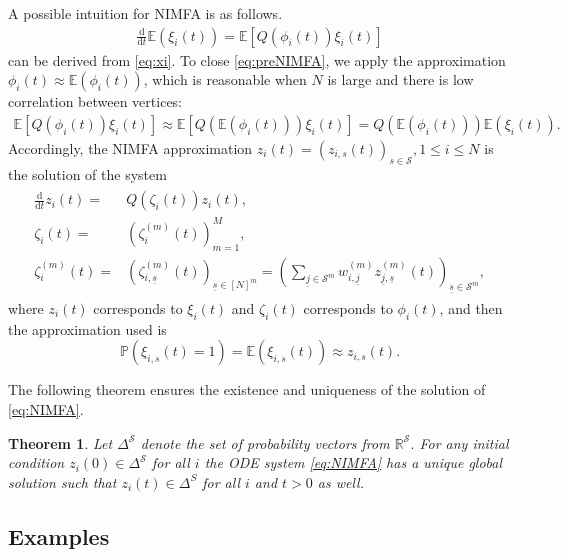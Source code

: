 \documentclass{article}
\newcommand{\pr}{\mathbb{P}}
\newcommand{\E}{\mathbb{E}}
\renewcommand{\d}{\mathrm{d}}
\newcommand{\1}[1]{{\mathds{1}}_{\left\{#1\right\}}}
\renewcommand{\S}{\mathcal{S}}
\newtheorem{theorem}{Theorem}
\begin{document}
	A possible intuition for NIMFA is as follows.
	\begin{align}
		\label{eq:preNIMFA}
		\frac{\d}{\d t} \E \left(\xi_{i}(t) \right)= \E \left[Q \left(\phi_{i}(t)\right) \xi_{i}(t) \right]
	\end{align}
	can be derived from \eqref{eq:xi}. To close \eqref{eq:preNIMFA}, we apply the approximation $\phi_{i}(t) \approx \E \left( \phi_i(t) \right)$, which is reasonable when $N$ is large and there is low correlation between vertices:
	\begin{align*}
		\E \left[Q \left(\phi_{i}(t)\right) \xi_{i}(t) \right] \approx  \E \left[Q \left(\E \left(\phi_{i}(t) \right )\right) \xi_{i}(t) \right]=Q \left(\E \left(\phi_{i}(t) \right )\right) \E \left(\xi_{i}(t) \right).
	\end{align*}
	Accordingly, the NIMFA approximation $z_i(t)=(z_{i,s}(t))_{s\in \S},1\leq i\leq N$ is the solution of the system
	\begin{align}
		\label{eq:NIMFA}
		\begin{split}
			\frac{\d}{\d t} z_{i}(t)=& Q \left(\zeta_{i}(t) \right)z_{i}(t), \\
			\zeta_{i}(t)=& \left(\zeta_{i}^{(m)}(t) \right)_{m=1}^M, \\
			\zeta_{i}^{(m)}(t)=& \left(\zeta_{i,\underline{s}}^{(m)}(t)\right)_{\underline{s} \in [N]^m}=\left(\sum_{\underline{j} \in \S^m} w_{i,\underline{j}}^{(m)} z_{\underline{j},\underline{s}}^{(m)}(t) \right)_{\underline{s} \in \S^m},
		\end{split}	
	\end{align}
	where $z_i(t)$ corresponds to $\xi_i(t)$ and $\zeta_i(t)$ corresponds to $\phi_i(t)$, and then the approximation used is
	$$\pr \left(\xi_{i,s}(t)=1\right)=\E \left(\xi_{i,s}(t)\right) \approx z_{i,s}(t).$$
	
	The following theorem ensures the existence and uniqueness of the solution of \eqref{eq:NIMFA}.
	
	\begin{theorem}
		\label{t:NIMFA_Delta}	
		Let $\Delta^{\S}$ denote the set of probability vectors from $\mathbb{R}^{\S}.$ 
		For any initial condition $ z_i(0) \in \Delta^{\S}$ for all $i$ the ODE system \eqref{eq:NIMFA} has a unique global solution such that $ z_{i}(t) \in \Delta^S$ for all $i$ and $t>0$ as well.
	\end{theorem}
	
	\subsection{Examples}
	
\end{document}
